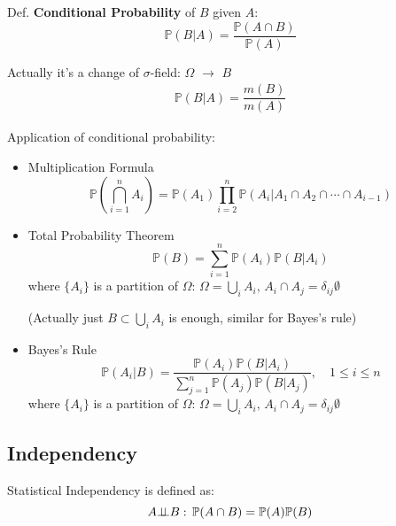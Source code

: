     Def. \textbf{Conditional Probability} of $B$ given $A$:
    \begin{equation}    
        \mathbb{P}(B|A)=\frac{\mathbb{P}(A\cap B)}{\mathbb{P}(A)}    
    \end{equation}

    Actually it's a change of $\sigma$-field: $\Omega$ $ \to $ $B$
    \begin{align}
        \mathbb{P}\left( B|A \right) = \dfrac{m(B)}{m(A)} 
    \end{align}


\begin{point}
    Application of conditional probability:
\end{point}

        \begin{itemize}
        \item Multiplication Formula
        \begin{equation}    
            \mathbb{P}(\bigcap_{i=1}^n A_i)=\mathbb{P}(A_1)\prod_{i=2}^n \mathbb{P}(A_i|A_1\cap A_2\cap \cdots\cap A_{i-1})    
        \end{equation}
        \item Total Probability Theorem
        \begin{equation}    
            \mathbb{P}(B)=\sum_{i=1}^n \mathbb{P}(A_i)\mathbb{P}(B|A_i)  
        \end{equation}
        where $\{A_i\}$ is a partition of $\Omega$: $ \Omega =\bigcup_{i}A_i ,\, A_i\cap A_j=\delta _{ij}\emptyset$

        (Actually just $ B\subset \bigcup_{i}A_i $ is enough, similar for Bayes's rule)
        \item Bayes's Rule
        \begin{equation}    
            \mathbb{P}(A_i|B)=\dfrac{\mathbb{P}(A_i)\mathbb{P}(B|A_i)}{\sum_{j=1}^n\mathbb{P}(A_j)\mathbb{P}(B|A_j)}    ,\quad 1\leq i\leq n
        \end{equation}
        where $\{A_i\}$ is a partition of $\Omega$: $ \Omega =\bigcup_{i}A_i,\, A_i\cap A_j=\delta _{ij}\emptyset $
    \end{itemize}

\subsection{Independency}
    Statistical Independency is defined as:
    \begin{equation}    
        A\bot\!\!\!\bot B:\,\mathbb{P}(A\cap B) =\mathbb{P}(A)\mathbb{P}(B)
    \end{equation}

